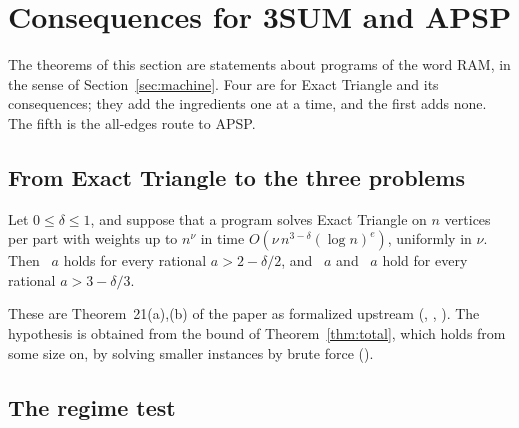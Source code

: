 
\section{Consequences for 3SUM and APSP}
\label{sec:consequences}

The theorems of this section are statements about programs of the word RAM, in
the sense of Section~\ref{sec:machine}.  Four are for Exact Triangle and its
consequences; they add the ingredients one at a time, and the first adds none.
The fifth is the all-edges route to APSP.

\subsection{From Exact Triangle to the three problems}

\begin{proposition}\label{prop:transfer}
Let \(0\le\delta\le1\), and suppose that a program solves Exact Triangle on
\(n\) vertices per part with weights up to \(n^{\nu}\) in time
\(O(\nu\,n^{3-\delta}(\log n)^{e})\), uniformly in \(\nu\).  Then
~\(a\) holds for every rational \(a>2-\delta/2\), and
~\(a\) and ~\(a\) hold for
every rational \(a>3-\delta/3\).
\end{proposition}

These are Theorem~21(a),(b) of the paper as formalized upstream
(, ,
).  The hypothesis is obtained from the bound of
Theorem~\ref{thm:total}, which holds from some size on, by solving smaller
instances by brute force ().

\subsection{The regime test}
\label{sec:regime}

